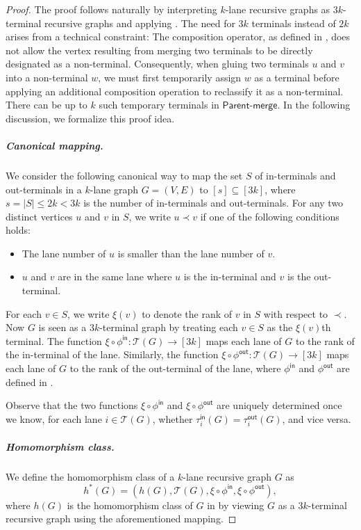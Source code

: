 \documentclass[11pt]{article}
\theoremstyle{definition}
\theoremstyle{remark}
\newcommand{\tin}{\tau^{\mathsf{in}}}
\newcommand{\tout}{\tau^{\mathsf{out}}}
\newcommand{\fin}{\phi^{\mathsf{in}}}
\newcommand{\fout}{\phi^{\mathsf{out}}}
\newcommand{\pmerge}{\mathsf{Parent}\text{-}\mathsf{merge}}
\begin{document}
\begin{proof}
The proof follows naturally by interpreting $k$-lane recursive graphs as $3k$-terminal recursive graphs and applying . The need for $3k$ terminals instead of $2k$ arises from a technical constraint: The composition operator, as defined in , does not allow the vertex resulting from merging two terminals to be directly designated as a non-terminal. Consequently, when gluing two terminals $u$ and $v$ into a non-terminal $w$, we must first temporarily assign $w$ as a terminal before applying an additional composition operation to reclassify it as a non-terminal. There can be up to $k$ such temporary terminals in $\pmerge$. In the following discussion, we formalize this proof idea.

\subparagraph{Canonical mapping.} We consider the following canonical way to map the set $S$ of in-terminals and out-terminals in a $k$-lane graph $G=(V,E)$ to $[s] \subseteq [3k]$, where $s = |S| \leq 2k < 3k$ is the number of in-terminals and out-terminals. For any two distinct vertices $u$ and $v$ in $S$, we write $u \prec v$ if one of the following conditions holds:
\begin{itemize}
    \item The lane number of $u$ is smaller than the lane number of $v$.
    \item $u$ and $v$ are in the same lane where $u$ is the in-terminal and $v$ is the out-terminal.
\end{itemize}
For each $v \in S$, we write $\xi(v)$ to denote the rank of $v$ in $S$ with respect to $\prec$. Now $G$ is seen as a $3k$-terminal graph by treating each $v \in S$ as the $\xi(v)$th terminal. The function $\xi\circ \fin:\mathcal{T}(G)\rightarrow[3k]$ maps each lane of $G$ to the rank of the in-terminal of the lane. Similarly, the function $\xi\circ \fout:\mathcal{T}(G)\rightarrow[3k]$ maps each lane of $G$ to the rank of the out-terminal of the lane, where $\fin$ and $\fout$ are defined in . 

Observe that the two functions $\xi\circ \fin$ and $\xi\circ \fout$ are uniquely determined once we know, for each lane $i \in \mathcal{T}(G)$, whether $\tin_i(G)=\tout_i(G)$, and vice versa. 

\subparagraph{Homomorphism class.} We define the homomorphism class of a $k$-lane recursive graph $G$ as 
\[h^\ast(G) = (h(G), \mathcal{T}(G), \xi\circ \fin, \xi\circ \fout),\]
where $h(G)$ is the homomorphism class of $G$ in  by viewing $G$ as a $3k$-terminal recursive graph using the aforementioned mapping.


\end{proof}
\end{document}
